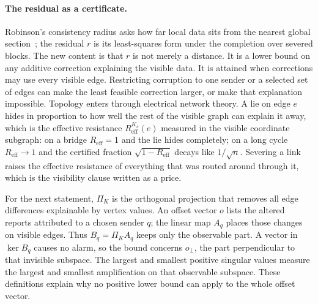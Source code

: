 \documentclass[11pt,a4paper]{article}
\theoremstyle{definition}
\theoremstyle{remark}
\begin{document}
\pdexercisepointer{\ref{ex:fh-consistency-radius-run}}{\ref{ex:fh-two-liar-boundary}}{\pageref{ex:fh-consistency-radius-run}}

\paragraph{The residual as a certificate.} Robinson's consistency radius asks how
far local data sits from the nearest global section~; the
residual $r$ is its least-squares form under the completion over severed
blocks. The new content is that $r$ is not merely a distance. It is a
lower bound on any additive correction explaining the visible data. It is
attained when corrections may use every visible edge. Restricting corruption
to one sender or a selected set of edges can make the least feasible
correction larger, or make that explanation impossible.
Topology enters through electrical network theory. A lie on edge $e$ hides in
proportion to how well the rest of the visible graph can explain it away,
which is the effective resistance $R^{K_c}_{\mathrm{eff}}(e)$ measured in the
visible coordinate subgraph: on a bridge $R_{\mathrm{eff}}=1$ and the lie
hides completely; on a long cycle $R_{\mathrm{eff}}\to1$ and the certified
fraction $\sqrt{1-R_{\mathrm{eff}}}$ decays like $1/\sqrt n$. Severing a link
raises the effective resistance of everything that was routed around through
it, which is the visibility clause written as a price.

For the next statement, $\Pi_K$ is the orthogonal projection that removes
all edge differences explainable by vertex values. An offset vector $o$
lists the altered reports attributed to a chosen sender $q$; the linear map
$A_q$ places those changes on visible edges. Thus $B_q=\Pi_K A_q$ keeps
only the observable part. A vector in $\ker B_q$ causes no alarm, so the
bound concerns $o_\perp$, the part perpendicular to that invisible subspace.
The largest and smallest positive singular values measure the largest and
smallest amplification on that observable subspace. These definitions
explain why no positive lower bound can apply to the whole offset vector.
\end{document}
